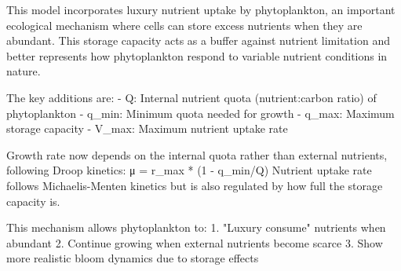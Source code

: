 This model incorporates luxury nutrient uptake by phytoplankton, an important ecological mechanism where cells can store excess nutrients when they are abundant. This storage capacity acts as a buffer against nutrient limitation and better represents how phytoplankton respond to variable nutrient conditions in nature.

The key additions are:
- Q: Internal nutrient quota (nutrient:carbon ratio) of phytoplankton
- q_min: Minimum quota needed for growth
- q_max: Maximum storage capacity
- V_max: Maximum nutrient uptake rate

Growth rate now depends on the internal quota rather than external nutrients, following Droop kinetics: μ = r_max * (1 - q_min/Q)
Nutrient uptake rate follows Michaelis-Menten kinetics but is also regulated by how full the storage capacity is.

This mechanism allows phytoplankton to:
1. "Luxury consume" nutrients when abundant
2. Continue growing when external nutrients become scarce
3. Show more realistic bloom dynamics due to storage effects
